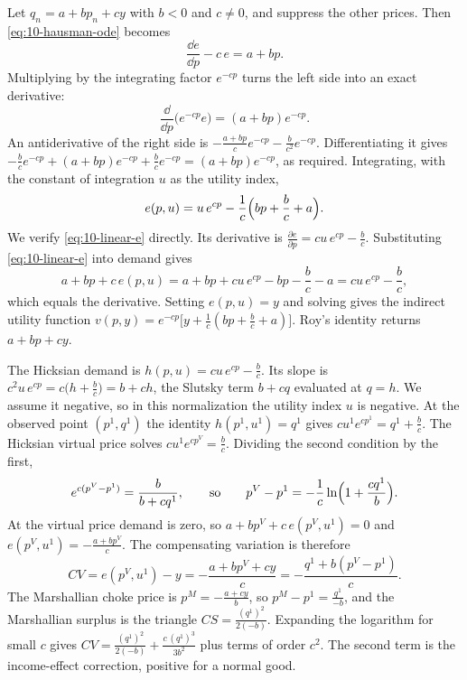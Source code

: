 \begin{example}\label{ex:10-linear-income}
Let $q_n = a + bp_n + cy$ with $b < 0$ and $c \neq 0$, and suppress the other prices. Then
\eqref{eq:10-hausman-ode} becomes
\begin{equation*}
  \frac{\dd e}{\dd p} - c\,e = a + bp .
\end{equation*}
Multiplying by the integrating factor $e^{-cp}$ turns the left side into an exact derivative:
\begin{equation*}
  \frac{\dd}{\dd p}\bigl(e^{-cp}e\bigr) = (a + bp)e^{-cp}.
\end{equation*}
An antiderivative of the right side is $-\frac{a + bp}{c}e^{-cp} - \frac{b}{c^2}e^{-cp}$. Differentiating it
gives $-\frac{b}{c}e^{-cp} + (a + bp)e^{-cp} + \frac{b}{c}e^{-cp} = (a + bp)e^{-cp}$, as required.
Integrating, with the constant of integration $u$ as the utility index,
\begin{equation}\label{eq:10-linear-e}
  e(p,u) = u\,e^{cp} - \frac{1}{c}\Bigl(bp + \frac{b}{c} + a\Bigr).
\end{equation}
We verify \eqref{eq:10-linear-e} directly. Its derivative is $\frac{\partial e}{\partial p} = cu\,e^{cp} -
\frac{b}{c}$. Substituting \eqref{eq:10-linear-e} into demand gives
\begin{equation*}
  a + bp + c\,e(p,u) = a + bp + cu\,e^{cp} - bp - \frac{b}{c} - a = cu\,e^{cp} - \frac{b}{c},
\end{equation*}
which equals the derivative. Setting $e(p,u) = y$ and solving gives the indirect utility function
$v(p,y) = e^{-cp}\bigl[y + \frac{1}{c}(bp + \frac{b}{c} + a)\bigr]$. Roy's identity returns $a + bp + cy$.

The Hicksian demand is $h(p,u) = cu\,e^{cp} - \frac{b}{c}$. Its slope is
$c^2u\,e^{cp} = c\bigl(h + \frac{b}{c}\bigr) = b + ch$, the Slutsky term $b + cq$ evaluated at $q = h$. We
assume it negative, so in this normalization the utility index $u$ is negative. At the observed point $(p^1,q^1)$ the identity
$h(p^1,u^1) = q^1$ gives $cu^1e^{cp^1} = q^1 + \frac{b}{c}$. The Hicksian virtual price solves
$cu^1e^{cp^V} = \frac{b}{c}$. Dividing the second condition by the first,
\begin{equation*}
  e^{c(p^V - p^1)} = \frac{b}{b + cq^1}, \qquad\text{so}\qquad p^V - p^1 = -\frac{1}{c}\ln\Bigl(1 + \frac{cq^1}{b}\Bigr).
\end{equation*}
At the virtual price demand is zero, so $a + bp^V + c\,e(p^V,u^1) = 0$ and $e(p^V,u^1) = -\frac{a + bp^V}{c}$.
The compensating variation is therefore
\begin{equation}\label{eq:10-linear-cv}
  CV = e(p^V,u^1) - y = -\frac{a + bp^V + cy}{c} = -\frac{q^1 + b(p^V - p^1)}{c}.
\end{equation}
The Marshallian choke price is $p^M = -\frac{a + cy}{b}$, so $p^M - p^1 = \frac{q^1}{-b}$, and the Marshallian
surplus is the triangle $CS = \frac{(q^1)^2}{2(-b)}$. Expanding the logarithm for small $c$ gives
$CV = \frac{(q^1)^2}{2(-b)} + \frac{c\,(q^1)^3}{3b^2}$ plus terms of order $c^2$. The second term is the
income-effect correction, positive for a normal good.


\end{example}
